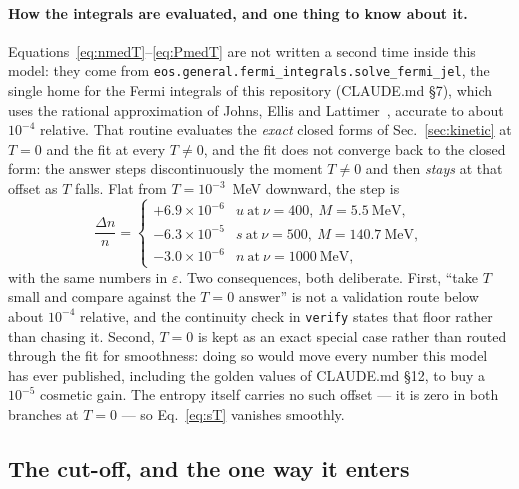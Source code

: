 \documentclass[aps,prc,onecolumn,superscriptaddress,nofootinbib,10pt]{revtex4-2}
\begin{document}
\paragraph{How the integrals are evaluated, and one thing to know about it.}
Equations~\eqref{eq:nmedT}--\eqref{eq:PmedT} are not written a second time
inside this model: they come from
\texttt{eos.general.fermi\_integrals.solve\_fermi\_jel}, the single home for
the Fermi integrals of this repository (CLAUDE.md \S7), which uses the
rational approximation of Johns, Ellis and
Lattimer~\cite{JohnsEllisLattimer1996}, accurate to about $10^{-4}$
relative. That routine evaluates the \emph{exact} closed forms of
Sec.~\ref{sec:kinetic} at $T = 0$ and the fit at every $T \ne 0$, and the fit
does not converge back to the closed form: the answer steps discontinuously
the moment $T \ne 0$ and then \emph{stays} at that offset as $T$ falls. Flat
from $T = 10^{-3}$~MeV downward, the step is
%
\begin{equation}
\frac{\Delta n}{n} = \begin{cases}
  +6.9\times10^{-6} & u\ \text{at}\ \nu = 400,\ M = 5.5\ \mathrm{MeV},\\
  -6.3\times10^{-5} & s\ \text{at}\ \nu = 500,\ M = 140.7\ \mathrm{MeV},\\
  -3.0\times10^{-6} & n\ \text{at}\ \nu = 1000\ \mathrm{MeV},
\end{cases}
\label{eq:jelfloor}
\end{equation}
%
with the same numbers in $\varepsilon$. Two consequences, both deliberate.
First, ``take $T$ small and compare against the $T = 0$ answer'' is not a
validation route below about $10^{-4}$ relative, and the continuity check in
\texttt{verify} states that floor rather than chasing it. Second, $T = 0$ is
kept as an exact special case rather than routed through the fit for
smoothness: doing so would move every number this model has ever published,
including the golden values of CLAUDE.md \S12, to buy a $10^{-5}$ cosmetic
gain. The entropy itself carries no such offset --- it is zero in both
branches at $T = 0$ --- so Eq.~\eqref{eq:sT} vanishes smoothly.

\subsection{The cut-off, and the one way it enters}
\label{sec:cutoff}
\end{document}
